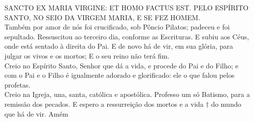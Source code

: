 \begin{multicols}{2}
	SANCTO EX MARIA VIRGINE: ET
	HOMO FACTUS EST.
	PELO ESPÍRITO SANTO, NO SEIO DA
	VIRGEM MARIA, E SE FEZ HOMEM.
	\\Também por amor de nós foi
	crucificado, sob Pôncio Pilatos; padeceu
	e foi sepultado. Ressuscitou ao terceiro
	dia, conforme as Escrituras. E subiu aos
	Céus, onde está sentado à direita do
	Pai. E de novo há de vir, em sua glória,
	para julgar os vivos e os mortos; E o seu
	reino não terá fim.
	\\Creio no Espírito Santo, Senhor que dá
	a vida, e procede do Pai e do Filho; e
	com o Pai e o Filho é igualmente
	adorado e glorificado: ele o que falou
	pelos profetas.
	\\Creio na Igreja, una, santa, católica e
	apostólica. Professo um só Batismo,
	para a remissão dos pecados. E espero a
	ressurreição dos mortos e a vida $\dag$ do
	mundo que há de vir. Amém
\end{multicols}